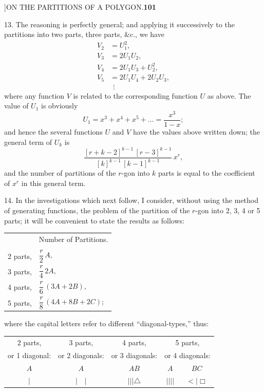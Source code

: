 \documentclass[11pt]{article}
\begin{document}
\newpage
{}]\hfill ON THE PARTITIONS OF A POLYGON.\hfill\textbf{101}

\smallskip
\hspace{1em} 13. The reasoning is perfectly general; and applying it
successively to the partitions into two parts, three parts, \&c., we have
\[
\begin{aligned}
V_{2} &= U_{1}^{2},\\
V_{3} &= 2U_{1}U_{2},\\
V_{4} &= 2U_{1}U_{3}+U_{2}^{2},\\
V_{5} &= 2U_{1}U_{4}+2U_{2}U_{3},\\
&\ \ \vdots
\end{aligned}
\]
where any function $V$ is related to the corresponding function $U$ as above.
The value of $U_{1}$ is obviously
\[
U_{1}=x^{3}+x^{4}+x^{5}+\ldots=\frac{x^{3}}{1-x};
\]
and hence the several functions $U$ and $V$ have the values above written
down; the general term of $U_{k}$ is
\[
\frac{[r+k-2]^{k-1}\,[r-3]^{k-1}}{[k]^{k-1}\,[k-1]^{k-1}}\,x^{r},
\]
and the number of partitions of the $r$-gon into $k$ parts is equal to the
coefficient of $x^{r}$ in this general term.

\hspace{1em} 14. In the investigations which next follow, I consider, without
using the method of generating functions, the problem of the partition of the
$r$-gon into $2$, 3, 4 or 5 parts; it will be convenient to state the results
as follows:
\begin{center}
\begin{tabular}{ll}
& Number of Partitions.\\
\\
2 parts, & $\dfrac{r}{2}\,A,$\\[6pt]
3 parts, & $\dfrac{r}{4}\,2A,$\\[6pt]
4 parts, & $\dfrac{r}{6}\,(3A+2B),$\\[6pt]
5 parts, & $\dfrac{r}{8}\,(4A+8B+2C);$
\end{tabular}
\end{center}
where the capital letters refer to different ``diagonal-types,'' thus:

\begin{center}
\begin{tabular}{ccccc}
2 parts, & 3 parts, & 4 parts, & \multicolumn{2}{c}{5 parts,}\\
or 1 diagonal: & or 2 diagonals: & or 3 diagonals: & \multicolumn{2}{c}{or 4 diagonals:}\\
$A$ & $A$ & $A$\quad $B$ & $A$ & $B$\quad $C$\\
$|$ & $|\quad|$ & $|||$\quad $\triangle$ & $||||$ & $<\!|$\quad $\Box$\\
\end{tabular}
\end{center}
\end{document}
